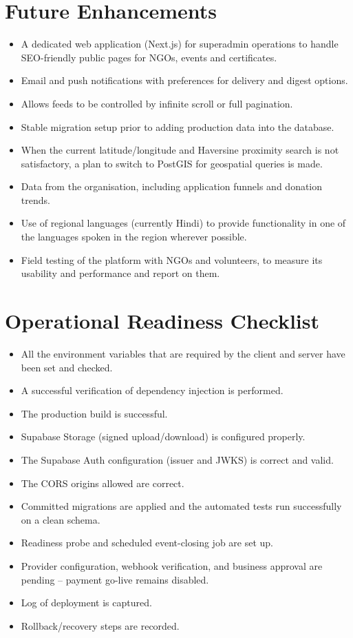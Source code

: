 \section{Future Enhancements}\label{sec:future} \begin{itemize} \item A dedicated web application (Next.js) for superadmin operations to handle SEO-friendly public pages for NGOs, events and certificates. \item Email and push notifications with preferences for delivery and digest options. \item Allows feeds to be controlled by infinite scroll or full pagination. \item Stable migration setup prior to adding production data into the database. \item When the current latitude/longitude and Haversine proximity search is not satisfactory, a plan to switch to PostGIS for geospatial queries is made. \item Data from the organisation, including application funnels and donation trends. \item Use of regional languages (currently Hindi) to provide functionality in one of the languages spoken in the region wherever possible. \item Field testing of the platform with NGOs and volunteers, to measure its usability and performance and report on them. \end{itemize}

\section{Operational Readiness Checklist} \begin{itemize} \item All the environment variables that are required by the client and server have been set and checked. \item A successful verification of dependency injection is performed. \item The production build is successful. \item Supabase Storage (signed upload/download) is configured properly. \item The Supabase Auth configuration (issuer and JWKS) is correct and valid. \item The CORS origins allowed are correct. \item Committed migrations are applied and the automated tests run successfully on a clean schema. \item Readiness probe and scheduled event-closing job are set up. \item Provider configuration, webhook verification, and business approval are pending -- payment go-live remains disabled. \item Log of deployment is captured. \item Rollback/recovery steps are recorded. \end{itemize}

